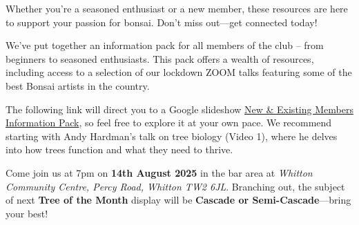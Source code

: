 Whether you're a seasoned enthusiast or a new member, these resources are here to support your passion for bonsai. Don't miss out---get connected today!

\medskip	
{}
\noindent
We've put together an information pack for all members of the club – from beginners to seasoned enthusiasts. This pack offers a wealth of resources, including access to a selection of our lockdown ZOOM talks featuring some of the best Bonsai artists in the country.

The following link will direct you to a Google slideshow \href{https://docs.google.com/presentation/d/1L5SRA_ZSvnGMLbRt0CSf-Uz7BaiOfxOs7OUHMM_XrTY/edit?usp=sharing}{New \& Existing Members Information Pack}, so feel free to explore it at your own pace. We recommend starting with Andy Hardman’s talk on tree biology (Video 1), where he delves into how trees function and what they need to thrive.

\medskip
{}
\noindent
Come join us at 7pm on \textbf{14th August 2025} in the bar area at \emph{Whitton Community Centre, Percy Road, Whitton TW2 6JL}. Branching out, the subject of next \textbf{Tree of the Month} display will be \textbf{Cascade or Semi\--Cascade}---bring your best!
	
	

\closearticle
\columnbreak

